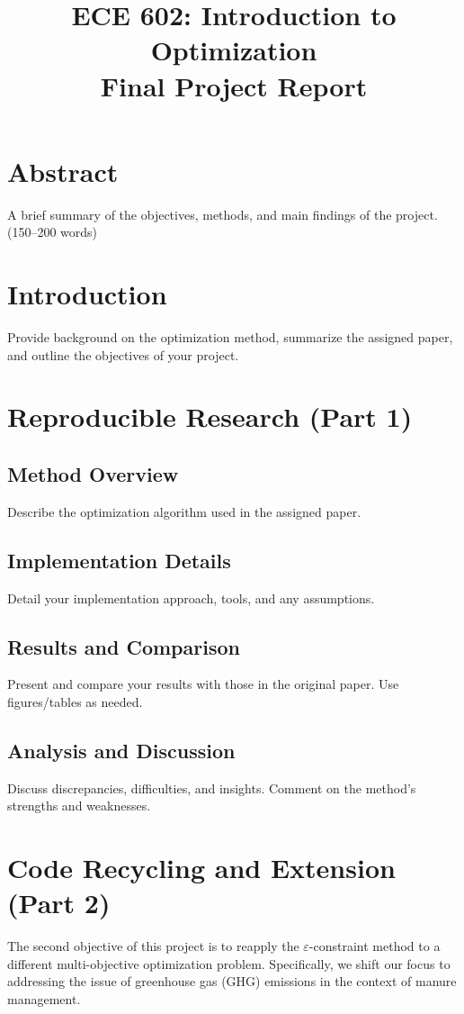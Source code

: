 \documentclass[12pt]{article}
\title{\textbf{ECE 602: Introduction to Optimization} \\ Final Project Report}
\date{}
\begin{document}
\maketitle

\section*{Abstract}
A brief summary of the objectives, methods, and main findings of the project. (150--200 words)

\section{Introduction}
Provide background on the optimization method, summarize the assigned paper, and outline the objectives of your project.

\section{Reproducible Research (Part 1)}
\subsection{Method Overview}
Describe the optimization algorithm used in the assigned paper.

\subsection{Implementation Details}
Detail your implementation approach, tools, and any assumptions.

\subsection{Results and Comparison}
Present and compare your results with those in the original paper. Use figures/tables as needed.

\subsection{Analysis and Discussion}
Discuss discrepancies, difficulties, and insights. Comment on the method's strengths and weaknesses.

\section{Code Recycling and Extension (Part 2)}
The second objective of this project is to reapply the $\varepsilon$-constraint method to a different multi-objective optimization problem. Specifically, we shift our focus to addressing the issue of greenhouse gas (GHG) emissions in the context of manure management.
\end{document}
